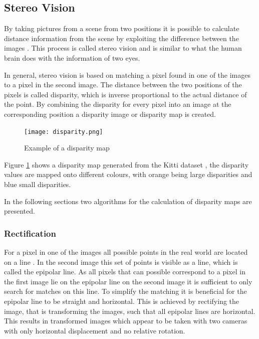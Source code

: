 \subsection{Stereo Vision}
By taking pictures from a scene from two positions it is possible to calculate distance information from the scene by exploiting the difference between the images \cite{stereoHaw10}.
This process is called stereo vision and is similar to what the human brain does with the information of two eyes. 

In general, stereo vision is based on matching a pixel found in one of the images to a pixel in the second image. 
The distance between the two positions of the pixels is called disparity, which is inverse proportional to the actual distance of the point. 
By combining the disparity for every pixel into an image at the corresponding position a disparity image or disparity map is created.

\begin{figure}[h!]
    \centering
    \texttt{[image: disparity.png]}
    \caption{Example of a disparity map }
    \label{fig:theo:disp}
\end{figure}

Figure \ref{fig:theo:disp} shows a disparity map generated from the Kitti dataset \cite{Menze2015CVPR}, the disparity values are mapped onto different colours, with orange being large disparities and blue small disparities.

In the following sections two algorithms for the calculation of disparity maps are presented.

\subsubsection{Rectification}
For a pixel in one of the images all possible points in the real world are located on a line \cite{stereoHaw10}.
In the second image this set of points is visible as a line, which is called the epipolar line. 
As all pixels that can possible correspond to a pixel in the first image lie on the epipolar line on the second image it is sufficient to only search for matches on this line.
To simplify the matching it is beneficial for the epipolar line to be straight and horizontal.
This is achieved by rectifying the image, that is transforming the images, such that all epipolar lines are horizontal. This results in transformed images which appear to be taken with two cameras with only horizontal displacement and no relative rotation.

